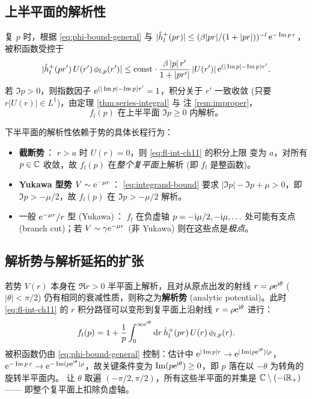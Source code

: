 \subsection{上半平面的解析性}\label{ssec:upper}

复 $p$ 时，根据 \eqref{eq:phi-bound-general} 与
$|\hat h^+_l(pr)|\leq (\beta|pr|/(1+|pr|))^{-l}\,\mathrm{e}^{-\Im p\, r}$，
被积函数受控于
\begin{equation}
|\hat h^+_l(pr')\,U(r')\,\phi_{l,p}(r')|
\leq \mathrm{const}\cdot \frac{\beta\,|p|\,r'}{1+|pr'|}\,|U(r')|\,
\mathrm{e}^{(|\Im p|-\Im p)r'}.
\label{eq:integrand-bound}
\end{equation}
若 $\Im p>0$，则指数因子 $\mathrm{e}^{(|\Im p|-\Im p)r'}=1$，积分关于 $r'$ 一致收敛
(只要 $r|U(r)|\in L^1$)，由定理 \ref{thm:series-integral} 与
注 \ref{rem:improper}，
\begin{equation}
\boxed{\;f_l(p)\text{ 在上半平面 }\Im p\geq 0\text{ 内解析。}\;}
\label{eq:fl-upper}
\end{equation}

\begin{remark}[势的形态决定下半平面行为]\label{rem:potential-tail}
下半平面的解析性依赖于势的具体长程行为：
\begin{itemize}
\item \textbf{截断势}\,： $r>a$ 时 $U(r)=0$，则 \eqref{eq:fl-int-ch11} 的积分上限
变为 $a$，对所有 $p\in\mathbb{C}$ 收敛，故 $f_l(p)$ 在\emph{整个复平面}上解析
(即 $f_l$ 是整函数)。
\item \textbf{Yukawa 型势} $V\sim \mathrm{e}^{-\mu r}$\,： \eqref{eq:integrand-bound}
要求 $|\Im p|-\Im p+\mu>0$，即 $\Im p>-\mu/2$，故 $f_l(p)$ 在
$\Im p>-\mu/2$ 解析。
\item 一般 $\mathrm{e}^{-\mu r}/r$ 型 (Yukawa)\,： $f_l$ 在负虚轴 $p=-\mathrm{i}\mu/2,
-\mathrm{i}\mu,\ldots$ 处可能有支点 (branch cut)；若 $V\sim\gamma\mathrm{e}^{-\mu r}$
(非 Yukawa) 则在这些点是\emph{极点}。
\end{itemize}
\end{remark}

\subsection{解析势与解析延拓的扩张}\label{ssec:analytic-potential}

若势 $V(r)$ 本身在 $\Re r>0$ 半平面上解析，且对从原点出发的射线 $r=\rho\mathrm{e}^{\mathrm{i}\theta}$
($|\theta|<\pi/2$) 仍有相同的衰减性质，则称之为\textbf{解析势} (analytic
potential)。此时 \eqref{eq:fl-int-ch11} 的 $r$ 积分路径可以变形到复平面上沿射线
$r=\rho\mathrm{e}^{\mathrm{i}\theta}$ 进行：
\begin{equation}
f_l(p)=1+\frac{1}{p}\int_0^{\infty\mathrm{e}^{\mathrm{i}\theta}}\mathrm{d} r\,\hat h^+_l(pr)\,U(r)\,\phi_{l,p}(r).
\label{eq:fl-rotated}
\end{equation}
被积函数仍由 \eqref{eq:phi-bound-general} 控制：估计中
$\mathrm{e}^{|\Im p|r}\to\mathrm{e}^{|\Im(p\mathrm{e}^{\mathrm{i}\theta})|\rho}$，
$\mathrm{e}^{-\Im p\,r}\to\mathrm{e}^{-\Im(p\mathrm{e}^{\mathrm{i}\theta})\rho}$，故关键条件变为
$\Im(p\mathrm{e}^{\mathrm{i}\theta})\geq 0$，即 $p$ 落在以 $-\theta$ 为转角的旋转半平面内。
让 $\theta$ 取遍 $(-\pi/2,\pi/2)$，所有这些半平面的并集是
$\mathbb{C}\setminus(-\mathrm{i}\mathbb{R}_+)$ —— 即整个复平面上扣除负虚轴。

